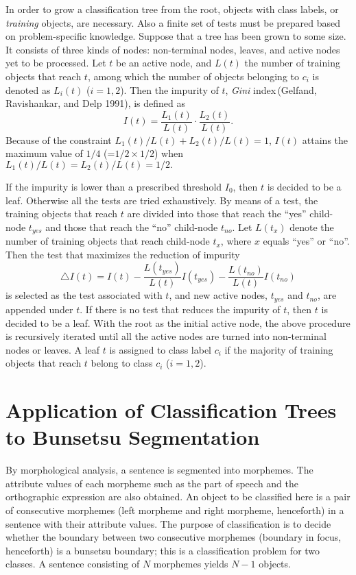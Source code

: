In order to grow a classification tree from the  root, 
objects with class labels,
 or {\em training} objects, are necessary. Also a finite set
of  tests must be prepared based on  problem-specific knowledge. 
Suppose that a tree has been grown to  some size.
It consists of three kinds of nodes: non-terminal nodes,
leaves, and active nodes yet to be processed.
 Let $t$ be an active node,
 and $L(t)$ the number of training objects that reach  $t$,
among which  the number of objects belonging to $c_{i}$
is denoted as $L_{i}(t)$ ($i=1, 2$).
Then the impurity of $t$, {\em Gini} index\,(Gelfand, Ravishankar, and 
Delp 1991), 
is defined as
\begin{displaymath}
I(t)= \frac{L_{1}(t)}{L(t)}\cdot \frac{L_{2}(t)}{L(t)}.
\end{displaymath}
Because of the constraint $L_{1}(t)/L(t)
+L_{2}(t)/L(t)=1$, $I(t)$ attains the maximum value of
$1/4$
(=$1/2 \times 1/2$)  when
$L_{1}(t)/L(t)= L_{2}(t)/L(t)=1/2.$  

 If the impurity is lower than a prescribed threshold $I_0$, then
$t$ is decided to be a leaf. Otherwise all the tests
are tried exhaustively. 
By means of a test, the training objects that reach
$t$ are divided into those that reach the ``yes'' child-node $t_{yes}$
and those that reach the ``no'' child-node $t_{no}$. Let $L(t_{x})$
denote the number of training
objects that reach child-node $t_{x}$, where $x$ equals ``yes''
 or ``no''.  Then the test that maximizes the reduction  of  impurity
\begin{displaymath}
\bigtriangleup I(t)=
 I(t)-\frac{L(t_{yes})}{L(t)}I(t_{yes})-\frac{L(t_{no})}{L(t)}I(t_{no})
\end{displaymath}
is selected as the test associated with $t$,
 and new active nodes, $t_{yes}$ and $t_{no}$,
are appended under $t$.
If there is no test that reduces  the impurity of $t$,
 then $t$ is decided to be
a leaf. With the root as the initial active node,
the above procedure is recursively iterated until
all the active nodes are turned into non-terminal nodes or leaves. 
A leaf $t$ is assigned to class label $c_{i}$ 
if the majority of training objects
that reach $t$ belong to class $c_{i}$ ($i=1, 2$).

\section{Application of Classification Trees to Bunsetsu Segmentation}
By morphological analysis, a sentence is segmented into morphemes. 
The attribute values of
each morpheme such as the part of speech  and 
the orthographic expression are also obtained.
An object to be classified
here is a  pair of consecutive morphemes  (left morpheme and right
morpheme, henceforth) in a sentence with their
attribute values.
The purpose of classification is to decide whether the boundary
between two consecutive morphemes (boundary in focus, henceforth)  
is a bunsetsu boundary;
this is a classification problem for two classes.
A sentence consisting of $N$ morphemes yields $N-1$
objects.

